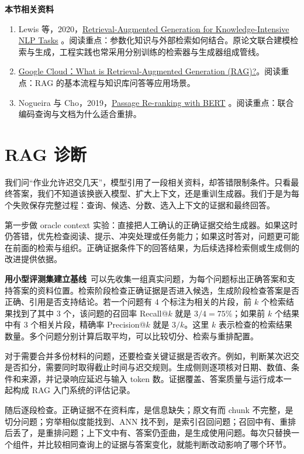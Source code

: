\textbf{本节相关资料}
\begin{enumerate}
    \item Lewis 等，2020，\href{https://arxiv.org/abs/2005.11401}{Retrieval-Augmented Generation for Knowledge-Intensive NLP Tasks} 。阅读重点：参数化知识与外部检索如何结合。原论文联合建模检索与生成，工程实践也常采用分别训练的检索器与生成器组成管线。
    \item \href{https://cloud.google.com/use-cases/retrieval-augmented-generation}{Google Cloud：What is Retrieval-Augmented Generation (RAG)?}。阅读重点：RAG 的基本流程与知识库问答等应用场景。
    \item Nogueira 与 Cho，2019，\href{https://arxiv.org/abs/1901.04085}{Passage Re-ranking with BERT} 。阅读重点：联合编码查询与文档为什么适合重排。
\end{enumerate}

\section{RAG 诊断}\label{RAG 诊断}

我们问``作业允许迟交几天''，模型引用了一段相关资料，却答错限制条件。只看最终答案，我们不知道该换嵌入模型、扩大上下文，还是重训生成器。我们于是为每个失败保存完整过程：查询、候选、分数、选入上下文的证据和最终回答。

第一步做 oracle context 实验：直接把人工确认的正确证据交给生成器。如果这时仍答错，优先检查阅读、提示、冲突处理或任务能力；如果这时答对，问题更可能在前面的检索与组织。正确证据条件下的回答结果，为后续选择检索侧或生成侧的改进提供依据。

\textbf{用小型评测集建立基线}~可以先收集一组真实问题，为每个问题标出正确答案和支持答案的资料位置。检索阶段检查正确证据是否进入候选，生成阶段检查答案是否正确、引用是否支持结论。若一个问题有 4 个标注为相关的片段，前 $k$ 个检索结果找到了其中 3 个，该问题的召回率 Recall@$k$ 就是 $3/4=75\%$；如果前 $k$ 个结果中有 3 个相关片段，精确率 Precision@$k$ 就是 $3/k$。这里 $k$ 表示检查的检索结果数量。多个问题分别计算后取平均，可以比较切分、检索与重排配置。

对于需要合并多份材料的问题，还要检查关键证据是否收齐。例如，判断某次迟交是否扣分，需要同时取得截止时间与迟交规则。生成侧则逐项核对日期、数值、条件和来源，并记录响应延迟与输入 token 数。证据覆盖、答案质量与运行成本一起构成 RAG 入门系统的评估记录。

随后逐段检查。正确证据不在资料库，是信息缺失；原文有而 chunk 不完整，是切分问题；穷举相似度能找到、ANN 找不到，是索引召回问题；召回中有、重排后丢了，是重排问题；上下文中有、答案仍歪曲，是生成使用问题。每次只替换一个组件，并比较相同查询上的证据与答案变化，就能判断改动影响了哪个环节。

